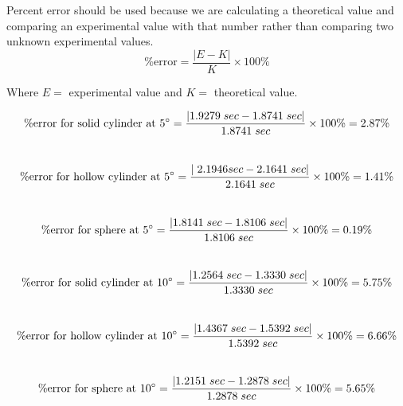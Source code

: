 \begin{center}
  \noindent Percent error should be used because we are calculating a theoretical
  value and comparing an experimental value with that number rather than comparing
  two unknown experimental values.\\
  \begin{equation*}
      \% \text{error} = \frac{|E - K|}{K} \times 100 \%
  \end{equation*}


  \noindent Where $E =$ experimental value and $K =$ theoretical value.

  \begin{equation*}
      \% \text{error for solid cylinder at 5\degree} 
      = \frac{|1.9279 \; sec - 1.8741 \; sec|}{1.8741 \; sec} \times 100\% = 2.87\%
  \end{equation*}\\

  \begin{equation*}
      \% \text{error for hollow cylinder at 5\degree} 
      = \frac{|\; 2.1946 sec - 2.1641 \; sec|}{2.1641 \; sec} \times 100\% = 1.41\%
  \end{equation*}\\

  \begin{equation*}
      \% \text{error for sphere at 5\degree} 
      = \frac{|1.8141 \; sec - 1.8106 \; sec|}{1.8106 \; sec} \times 100\% = 0.19\%
  \end{equation*}\\
  
  \begin{equation*}
      \% \text{error for solid cylinder at 10\degree} 
      = \frac{|1.2564 \; sec - 1.3330 \; sec|}{1.3330 \; sec} \times 100\% = 5.75\%
  \end{equation*}\\

  \begin{equation*}
      \% \text{error for hollow cylinder at 10\degree} 
      = \frac{|1.4367 \; sec - 1.5392 \; sec|}{1.5392 \; sec} \times 100\% = 6.66\%
  \end{equation*}\\

  \begin{equation*}
      \% \text{error for sphere at 10\degree} 
      = \frac{|1.2151 \; sec - 1.2878 \; sec|}{1.2878 \; sec} \times 100\% = 5.65\%
  \end{equation*}\\
\end{center}


